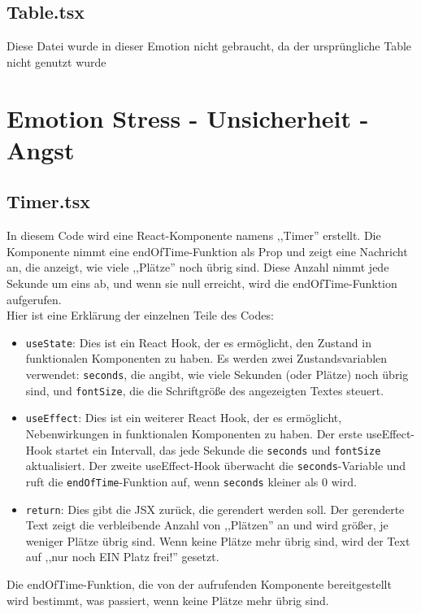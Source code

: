 \documentclass[./dokumentation.tex]{subfiles}
\begin{document}
\subsection{Table.tsx}
Diese Datei wurde in dieser Emotion nicht gebraucht, da der ursprüngliche Table nicht genutzt wurde 

\section{Emotion Stress - Unsicherheit - Angst}
\subsection{Timer.tsx}
In diesem Code wird eine React-Komponente namens ,,Timer'' erstellt. Die Komponente nimmt eine endOfTime-Funktion als Prop und zeigt eine Nachricht an, die anzeigt, wie viele ,,Plätze'' noch übrig sind. Diese Anzahl nimmt jede Sekunde um eins ab, und wenn sie null erreicht, wird die endOfTime-Funktion aufgerufen.\\

Hier ist eine Erklärung der einzelnen Teile des Codes:\\
\begin{itemize}
    \item \verb+useState+: Dies ist ein React Hook, der es ermöglicht, den Zustand in funktionalen Komponenten zu haben. Es werden zwei Zustandsvariablen verwendet: \verb+seconds+, die angibt, wie viele Sekunden (oder Plätze) noch übrig sind, und \verb+fontSize+, die die Schriftgröße des angezeigten Textes steuert.\\
    \item \verb+useEffect+: Dies ist ein weiterer React Hook, der es ermöglicht, Nebenwirkungen in funktionalen Komponenten zu haben. Der erste useEffect-Hook startet ein Intervall, das jede Sekunde die \verb+seconds+ und \verb+fontSize+ aktualisiert. Der zweite useEffect-Hook überwacht die \verb+seconds+-Variable und ruft die \verb+endOfTime+-Funktion auf, wenn \verb+seconds+ kleiner als 0 wird.\\
    \item \verb+return+: Dies gibt die JSX zurück, die gerendert werden soll. Der gerenderte Text zeigt die verbleibende Anzahl von ,,Plätzen'' an und wird größer, je weniger Plätze übrig sind. Wenn keine Plätze mehr übrig sind, wird der Text auf ,,nur noch EIN Platz frei!'' gesetzt.\\
\end{itemize}
Die endOfTime-Funktion, die von der aufrufenden Komponente bereitgestellt wird bestimmt, was passiert, wenn keine Plätze mehr übrig sind.
\end{document}
